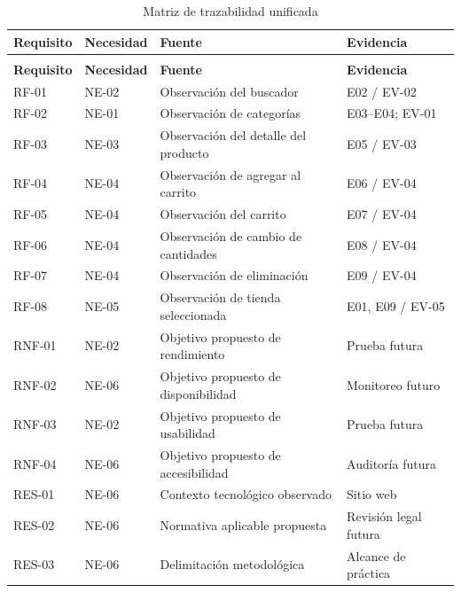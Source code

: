 \documentclass[12pt,a4paper]{article}
\renewcommand{\arraystretch}{1.17}
\begin{document}
\begingroup
\footnotesize
\setlength{\tabcolsep}{3pt}
\renewcommand{\arraystretch}{1.22}
\begin{longtable}{|>{\raggedright\arraybackslash}p{1.55cm}|>{\raggedright\arraybackslash}p{2.0cm}|>{\raggedright\arraybackslash}p{6.0cm}|>{\raggedright\arraybackslash}p{4.45cm}|}
\caption{Matriz de trazabilidad unificada}\\
\hline
\textbf{Requisito} & \textbf{Necesidad} & \textbf{Fuente} & \textbf{Evidencia} \\
\hline
\endfirsthead
\multicolumn{4}{c}{\textit{Continuación: Matriz de trazabilidad unificada}}\\
\hline
\textbf{Requisito} & \textbf{Necesidad} & \textbf{Fuente} & \textbf{Evidencia} \\
\hline
\endhead
RF-01 & NE-02 & Observación del buscador & E02 / EV-02 \\
\hline
RF-02 & NE-01 & Observación de categorías & E03--E04; EV-01 \\
\hline
RF-03 & NE-03 & Observación del detalle del producto & E05 / EV-03 \\
\hline
RF-04 & NE-04 & Observación de agregar al carrito & E06 / EV-04 \\
\hline
RF-05 & NE-04 & Observación del carrito & E07 / EV-04 \\
\hline
RF-06 & NE-04 & Observación de cambio de cantidades & E08 / EV-04 \\
\hline
RF-07 & NE-04 & Observación de eliminación & E09 / EV-04 \\
\hline
RF-08 & NE-05 & Observación de tienda seleccionada & E01, E09 / EV-05 \\
\hline
RNF-01 & NE-02 & Objetivo propuesto de rendimiento & Prueba futura \\
\hline
RNF-02 & NE-06 & Objetivo propuesto de disponibilidad & Monitoreo futuro \\
\hline
RNF-03 & NE-02 & Objetivo propuesto de usabilidad & Prueba futura \\
\hline
RNF-04 & NE-06 & Objetivo propuesto de accesibilidad & Auditoría futura \\
\hline
RES-01 & NE-06 & Contexto tecnológico observado & Sitio web \\
\hline
RES-02 & NE-06 & Normativa aplicable propuesta & Revisión legal futura \\
\hline
RES-03 & NE-06 & Delimitación metodológica & Alcance de práctica \\
\hline
\end{longtable}
\endgroup
\end{document}
